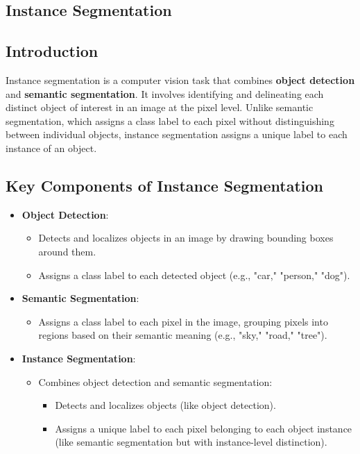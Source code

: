 \begin{notechapter}
\chapter{Instance Segmentation}\label{ch:instance-segmentation}

\section{Introduction}
Instance segmentation is a computer vision task that combines 
\textbf{object detection} and \textbf{semantic segmentation}. It 
involves identifying and delineating each distinct object of interest 
in an image at the pixel level. Unlike semantic segmentation, which 
assigns a class label to each pixel without distinguishing between 
individual objects, instance segmentation assigns a unique label to 
each instance of an object.

\section{Key Components of Instance Segmentation}
\begin{itemize}
  \item \textbf{Object Detection}:
    \begin{itemize}
      \item Detects and localizes objects in an image by drawing 
        bounding boxes around them.
      \item Assigns a class label to each detected object (e.g., 
        "car," "person," "dog").
    \end{itemize}
  \item \textbf{Semantic Segmentation}:
    \begin{itemize}
      \item Assigns a class label to each pixel in the image, grouping 
        pixels into regions based on their semantic meaning (e.g., 
        "sky," "road," "tree").
    \end{itemize}
  \item \textbf{Instance Segmentation}:
    \begin{itemize}
      \item Combines object detection and semantic segmentation:
        \begin{itemize}
          \item Detects and localizes objects (like object detection).
          \item Assigns a unique label to each pixel belonging to each 
            object instance (like semantic segmentation but with 
            instance-level distinction).
        \end{itemize}
    \end{itemize}
\end{itemize}


\end{notechapter}

